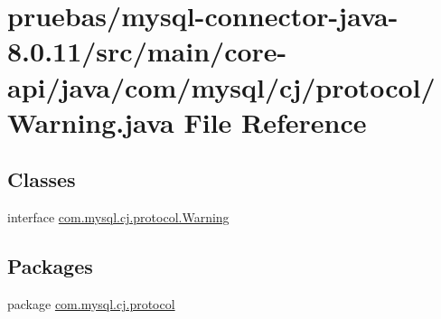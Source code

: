 \hypertarget{core-api_2java_2com_2mysql_2cj_2protocol_2_warning_8java}{}\section{pruebas/mysql-\/connector-\/java-\/8.0.11/src/main/core-\/api/java/com/mysql/cj/protocol/\+Warning.java File Reference}
\label{core-api_2java_2com_2mysql_2cj_2protocol_2_warning_8java}
\subsection*{Classes}
\begin{DoxyCompactItemize}
\item 
interface \mbox{\hyperlink{interfacecom_1_1mysql_1_1cj_1_1protocol_1_1_warning}{com.\+mysql.\+cj.\+protocol.\+Warning}}
\end{DoxyCompactItemize}
\subsection*{Packages}
\begin{DoxyCompactItemize}
\item 
package \mbox{\hyperlink{namespacecom_1_1mysql_1_1cj_1_1protocol}{com.\+mysql.\+cj.\+protocol}}
\end{DoxyCompactItemize}
